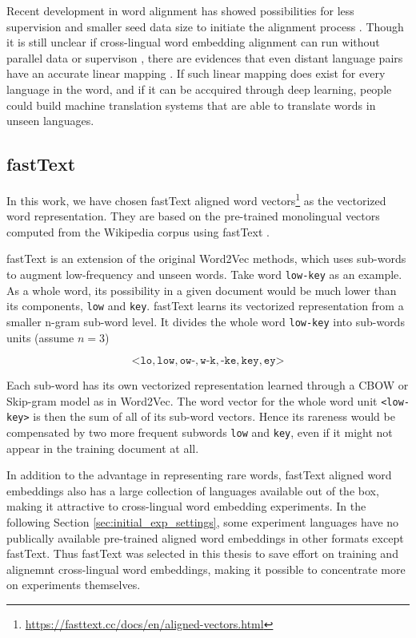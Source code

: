 \documentclass[thesis,fonts=libertine]{cluu}
\begin{document}
Recent development in word alignment has showed possibilities for less supervision and smaller seed data size to initiate the alignment process \parencite{Ruder:2019aa}. Though it is still unclear if cross-lingual word embedding alignment can run without parallel data or supervison \parencite{Dyer1365879}, there are evidences that even distant language pairs have an accurate linear mapping \parencite{Mikolov:2013ac}. If such linear mapping does exist for every language in the word, and if it can be accquired through deep learning, people could build machine translation systems that are able to translate words in unseen languages.

\subsection{fastText}
\label{sec:fasttext}

In this work, we have chosen fastText aligned word vectors\footnote{\url{https://fasttext.cc/docs/en/aligned-vectors.html}} \parencite{Joulin:2018aa} as the vectorized word representation. They are based on the pre-trained monolingual vectors computed from the Wikipedia corpus using fastText \parencite{Bojanowski:2016aa}.

fastText is an extension of the original Word2Vec methods, which uses sub-words to augment low-frequency and unseen words. Take word \texttt{low-key} as an example. As a whole word, its possibility in a given document would be much lower than its components, \texttt{low} and \texttt{key}. fastText learns its vectorized representation from a smaller n-gram sub-word level. It divides the whole word \texttt{low-key} into sub-words units (assume $n=3$)

\begin{equation*}
  \mathtt{\text{<}lo, low, ow\text{-}, w\text{-}k, \text{-}ke, key, ey\text{>}}
\end{equation*}

\noindent Each sub-word has its own vectorized representation learned through a CBOW or Skip-gram model as in Word2Vec. The word vector for the whole word unit \texttt{<low-key>} is then the sum of all of its sub-word vectors. Hence its rareness would be compensated by two more frequent subwords \texttt{low} and \texttt{key}, even if it might not appear in the training document at all.

In addition to the advantage in representing rare words, fastText aligned word embeddings also has a large collection of languages available out of the box, making it attractive to cross-lingual word embedding experiments. In the following Section \ref{sec:initial_exp_settings}, some experiment languages have no publically available pre-trained aligned word embeddings in other formats except fastText. Thus fastText was selected in this thesis to save effort on training and alignemnt cross-lingual word embeddings, making it possible to concentrate more on experiments themselves.
\end{document}
